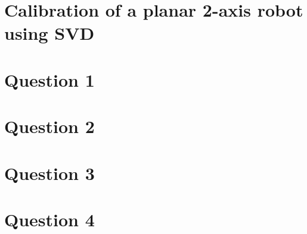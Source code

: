 \section*{Calibration of a planar 2-axis robot using SVD}
\section*{Question 1}

\section*{Question 2}

\section*{Question 3}

\section*{Question 4}